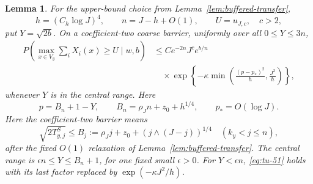 \documentclass[12pt,reqno]{amsart}
\theoremstyle{plain}
\newtheorem{lemma}[theorem]{Lemma}
\theoremstyle{definition}
\theoremstyle{remark}
\numberwithin{equation}{section}
\begin{document}
\begin{lemma}
For the upper-bound choice from Lemma~\ref{lem:buffered-transfer},
\[
 h=(C_h\log J)^4,\qquad n=J-h+O(1),\qquad
 U=u_{J,c},\quad c>2,
\]
put \(Y=\sqrt{2b}\).  On a coefficient-two coarse barrier, uniformly over
all \(0\le Y\le 3n\),
\begin{equation}
\begin{split}
 P\left(\max_{x\in V_y}\sum_iX_i(x)\ge U\mid w,b\right)
 &\le C e^{-2n}J^c e^{b/n}\\
 &\quad{}\times
 \exp\left\{-\kappa\min\left(
 \frac{(p-p_*)^2}{h},\frac{J^2}{h}\right)\right\},            \end{split}
\label{eq:tu-51}
\end{equation}
whenever \(Y\) is in the central range.  Here
\[
 p=B_n+1-Y,\qquad B_n=\rho_Jn+z_0+h^{1/4},\qquad
 p_*=O(\log J).
\]
Here the coefficient-two barrier means
\begin{equation}
 \sqrt{2T^S_{y,j}}\le
 B_j:=\rho_Jj+z_0+(j\wedge(J-j))^{1/4}
 \quad(k_y<j\le n),                                         \label{eq:tu-52}
\end{equation}
after the fixed \(O(1)\) relaxation of Lemma~\ref{lem:buffered-transfer}.  The central range is
\(\epsilon n\le Y\le B_n+1\), for one fixed small
\(\epsilon>0\).  For \(Y<\epsilon n\), \eqref{eq:tu-51} holds with its last factor
replaced by \(\exp(-\kappa J^2/h)\).
\end{lemma}
\end{document}
